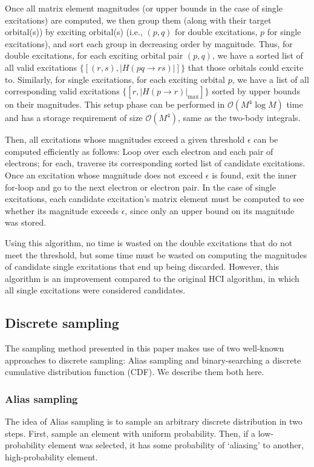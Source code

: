 \documentclass[english]{article}
\begin{document}
Once all matrix element magnitudes (or upper bounds in the case of single excitations) are computed, we then group them (along with their target orbital(s)) by exciting orbital(s) (i.e., $(p,q)$ for double excitations, $p$ for single excitations), and sort each group in decreasing order by magnitude. Thus, for double excitations, for each exciting orbital pair $(p,q)$, we have a sorted list of all valid excitations $\{[(r,s), |H(pq\rightarrow rs)|]\}$ that those orbitals could excite to. Similarly, for single excitations, for each exciting orbital $p$, we have a list of all corresponding valid excitations $\{[r, |H(p\rightarrow r)|_\textrm{max}]\}$ sorted by upper bounds on their magnitudes. This setup phase can be performed in $\mathcal{O}(M^4\log M)$ time and has a storage requirement of size $\mathcal{O}(M^4)$, same as the two-body integrals.

Then, all excitations whose magnitudes exceed a given threshold $\epsilon$ can be computed efficiently as follows: Loop over each electron and each pair of electrons; for each, traverse its corresponding sorted list of candidate excitations. Once an excitation whose magnitude does not exceed $\epsilon$ is found, exit the inner for-loop and go to the next electron or electron pair. In the case of single excitations, each candidate excitation's matrix element must be computed to see whether its magnitude exceeds $\epsilon$, since only an upper bound on its magnitude was stored.

Using this algorithm, no time is wasted on the double excitations that do not meet the threshold, but some time must be wasted on computing the magnitudes of candidate single excitations that end up being discarded. However, this algorithm is an improvement compared to the original HCI algorithm, in which all single excitations were considered candidates.


\subsection{Discrete sampling}
The sampling method presented in this paper makes use of two well-known approaches to discrete sampling: Alias sampling and binary-searching a discrete cumulative distribution function (CDF). We describe them both here.

\subsubsection{Alias sampling}
The idea of Alias sampling is to sample an arbitrary discrete distribution in two steps. First, sample an element with uniform probability. Then, if a low-probability element was selected, it has some probability of `aliasing' to another, high-probability element.
\end{document}
